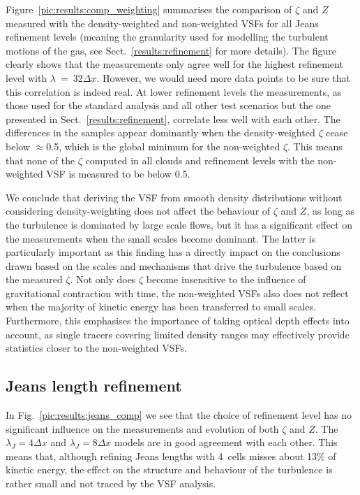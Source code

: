 \documentclass{aa}		%
\begin{document}
Figure~\ref{pic:results:comp_weighting} summarises the comparison of $\zeta$ and $Z$ measured with the density-weighted and non-weighted VSFs for all Jeans refinement levels (meaning the granularity used for modelling the turbulent motions of the gas, see Sect.~\ref{results:refinement} for more details).
The figure clearly shows that the measurements only agree well for the highest refinement level with $\lambda~=~32\Delta x$.
However, we would need more data points to be sure that this correlation is indeed real.
At lower refinement levels the measurements, as those used for the standard analysis and all other test scenarios but the one presented in Sect.~\ref{results:refinement}, correlate less well with each other. 
The differences in the samples appear dominantly when the density-weighted $\zeta$ cease below $\approx$0.5, which is the global minimum for the non-weighted $\zeta$. 
This means that none of the $\zeta$ computed in all clouds and refinement levels with the non-weighted VSF is measured to be below 0.5.

We conclude that deriving the VSF from smooth density distributions without considering density-weighting does not affect the behaviour of $\zeta$ and $Z$, as long as the turbulence is dominated by large scale flows, but it has a significant effect on the measurements when the small scales become dominant.
The latter is particularly important as this finding has a directly impact on the conclusions drawn based on the scales and mechanisms that drive the turbulence based on the measured $\zeta$.
Not only does $\zeta$ become insensitive to the influence of gravitational contraction with time, the non-weighted VSFs also does not reflect when the majority of kinetic energy has been transferred to small scales. 
Furthermore, this emphasises the importance of taking optical depth effects into account, as single tracers covering limited density ranges may effectively provide statistics closer to the non-weighted VSFs.



\subsection{Jeans length refinement}\label{discussion:refinement}

In Fig.~\ref{pic:results:jeans_comp} we see that the choice of refinement level has no significant influence on the measurements and evolution of both $\zeta$ and $Z$. 
The $\lambda_J=4\Delta{}x$ and $\lambda_J=8\Delta{}x$ models are in good agreement with each other.
This means that, although refining Jeans lengths with 4~cells misses about 13\% of kinetic energy, the effect on the structure and behaviour of the turbulence is rather small and not traced by the VSF analysis.
\end{document}
